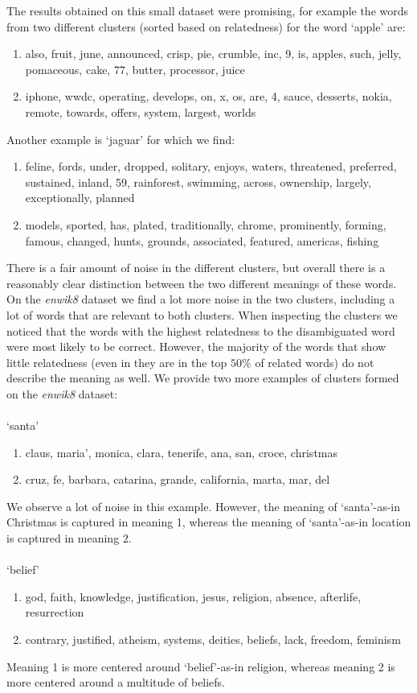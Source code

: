 \documentclass[11pt]{article}
\begin{document}
The results obtained on this small dataset were promising, for example the words from two different clusters  (sorted based on relatedness) for the word `apple' are: 
\begin{enumerate}
\item also, fruit, june, announced, crisp, pie, crumble, inc, 9, is, apples, such, jelly, pomaceous, cake, 77, butter, processor, juice
\item iphone, wwdc, operating, develops, on, x, os, are, 4, sauce, desserts, nokia, remote, towards, offers, system, largest, worlds
\end{enumerate}
Another example is `jaguar' for which we find: 
\begin{enumerate}
\item feline, fords, under, dropped, solitary, enjoys, waters, threatened, preferred, sustained, inland, 59, rainforest, swimming, across, ownership, largely, exceptionally, planned
\item models, sported, has, plated, traditionally, chrome, prominently, forming, famous, changed, hunts, grounds, associated, featured, americas, fishing
\end{enumerate}
There is a fair amount of noise in the different clusters, but overall there is a reasonably clear distinction between the two different meanings of these words.
On the \textit{enwik8} dataset we find a lot more noise in the two clusters, including a lot of words that are relevant to both clusters. When inspecting the clusters we noticed that the words with the highest relatedness to the disambiguated word were most likely to be correct. However, the majority of the words that show little relatedness (even in they are in the top $50\%$ of related words) do not describe the meaning as well. We provide two more examples of clusters formed on the \textit{enwik8} dataset:\\\\
`santa'
\begin{enumerate}
\item claus, maria', monica, clara, tenerife, ana, san, croce, christmas
\item cruz, fe, barbara, catarina, grande, california, marta, mar, del
\end{enumerate}
We observe a lot of noise in this example. However, the meaning of `santa'-as-in Christmas is captured in meaning 1, whereas the meaning of `santa'-as-in location is captured in meaning 2. \\\\
`belief'
\begin{enumerate}
\item god, faith, knowledge, justification, jesus, religion, absence, afterlife, resurrection
\item contrary, justified, atheism, systems, deities, beliefs, lack, freedom, feminism
\end{enumerate}
Meaning 1 is more centered around `belief'-as-in religion, whereas meaning 2 is more centered around a multitude of beliefs. 
\end{document}
